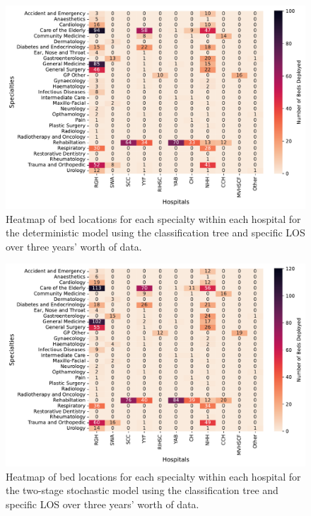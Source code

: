 \documentclass[thesis.tex]{subfiles}
\begin{document}
\begin{figure}[h!]
    \centering
    \includegraphics[scale=0.55]{Figures - Heatmaps/Fig37.pdf}
\caption{Heatmap of bed locations for each specialty within each hospital for the deterministic model using the classification tree and specific LOS over three years' worth of data.}
    \label{fig:app14a}
\end{figure}
\begin{figure}[h!]
    \centering
    \includegraphics[scale=0.55]{Figures - Heatmaps/Fig38.pdf}
\caption{Heatmap of bed locations for each specialty within each hospital for the two-stage stochastic model using the classification tree and specific LOS over three years' worth of data.}
    \label{fig:app14b}
\end{figure}
\end{document}
